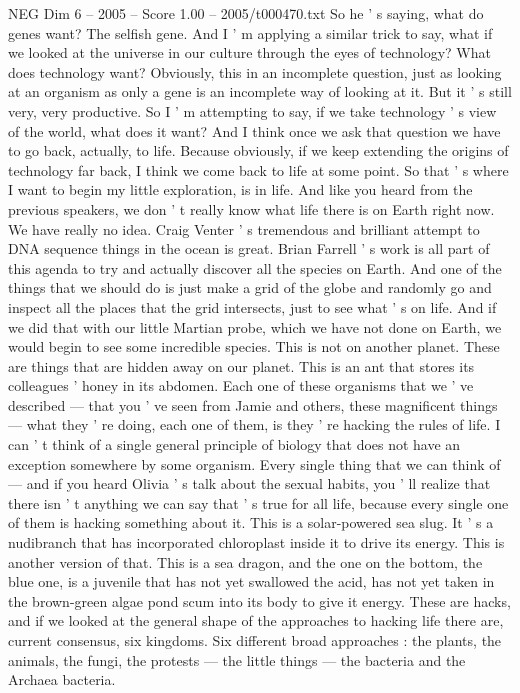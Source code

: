 \begin{textsample}{NEG Dim 6 – 2005 – Score 1.00 – 2005/t000470.txt}
So he ' s saying, what do genes want?
The selfish gene.
And I ' m applying a similar trick to say, what if we looked at the universe in our culture through the eyes of technology?
What does technology want?
Obviously, this in an incomplete question, just as looking at an organism as only a gene is an incomplete way of looking at it.
But it ' s still very, very productive.
So I ' m attempting to say, if we take technology ' s view of the world, what does it want?
And I think once we ask that question we have to go back, actually, to life.
Because obviously, if we keep extending the origins of technology far back, I think we come back to life at some point.
So that ' s where I want to begin my little exploration, is in life.
And like you heard from the previous speakers, we don ' t really know what life there is on Earth right now.
We have really no idea.
Craig Venter ' s tremendous and brilliant attempt to DNA sequence things in the ocean is great.
Brian Farrell ' s work is all part of this agenda to try and actually discover all the species on Earth.
And one of the things that we should do is just make a grid of the globe and randomly go and inspect all the places that the grid intersects, just to see what ' s on life.
And if we did that with our little Martian probe, which we have not done on Earth, we would begin to see some incredible species.
This is not on another planet.
These are things that are hidden away on our planet.
This is an ant that stores its colleagues ' honey in its abdomen.
Each one of these organisms that we ' ve described — that you ' ve seen from Jamie and others, these magnificent things — what they ' re doing, each one of them, is they ' re hacking the rules of life.
I can ' t think of a single general principle of biology that does not have an exception somewhere by some organism.
Every single thing that we can think of — and if you heard Olivia ' s talk about the sexual habits, you ' ll realize that there isn ' t anything we can say that ' s true for all life, because every single one of them is hacking something about it.
This is a solar-powered sea slug.
It ' s a nudibranch that has incorporated chloroplast inside it to drive its energy.
This is another version of that.
This is a sea dragon, and the one on the bottom, the blue one, is a juvenile that has not yet swallowed the acid, has not yet taken in the brown-green algae pond scum into its body to give it energy.
These are hacks, and if we looked at the general shape of the approaches to hacking life there are, current consensus, six kingdoms.
Six different broad approaches : the plants, the animals, the fungi, the protests — the little things — the bacteria and the Archaea bacteria.

\end{textsample}

